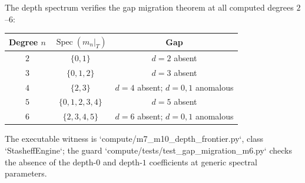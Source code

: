 \begin{computation}
The depth spectrum verifies the gap migration theorem
at all computed degrees $2$--$6$:
\begin{center}
\small
\renewcommand{\arraystretch}{1.15}
\begin{tabular}{@{}ccc@{}}
\textbf{Degree $n$} & $\operatorname{Spec}(m_n|_T)$
 & \textbf{Gap} \\
\hline
$2$ & $\{0, 1\}$ & $d = 2$ absent \\
$3$ & $\{0, 1, 2\}$ & $d = 3$ absent \\
$4$ & $\{2, 3\}$ & $d = 4$ absent; $d=0,1$ anomalous \\
$5$ & $\{0, 1, 2, 3, 4\}$ & $d = 5$ absent \\
$6$ & $\{2, 3, 4, 5\}$ & $d = 6$ absent; $d=0,1$ anomalous
\end{tabular}
\end{center}
The executable witness is `compute/m7_m10_depth_frontier.py`,
class `StasheffEngine`; the guard
`compute/tests/test_gap_migration_m6.py` checks the absence of the
depth-$0$ and depth-$1$ coefficients at generic spectral parameters.
\end{computation}

